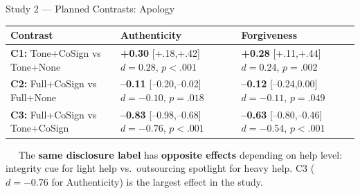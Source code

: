 \documentclass[10pt,aspectratio=169]{beamer}
\newcommand{\emphmark}[1]{\textcolor{chiAccent}{\textbf{#1}}}
\begin{document}
\begin{frame}{Study 2 --- Planned Contrasts: Apology}
\vspace{4pt}
\small
\renewcommand{\arraystretch}{1.3}
\begin{center}
\begin{tabular}{@{}p{4.4cm} p{4.6cm} p{4.2cm}@{}}
  \toprule
  \textbf{Contrast} & \textbf{Authenticity} & \textbf{Forgiveness}\\
  \midrule
  \textbf{C1:} Tone+CoSign \newline vs Tone+None
    & \textcolor{chiGreen}{\textbf{+0.30}} {\scriptsize[+.18,+.42]} \newline $d{=}0.28$, $p{<}.001$
    & \textcolor{chiGreen}{\textbf{+0.28}} {\scriptsize[+.11,+.44]} \newline $d{=}0.24$, $p{=}.002$\\[4pt]
  \textbf{C2:} Full+CoSign \newline vs Full+None
    & \textcolor{chiRed}{\textbf{--0.11}} {\scriptsize[--0.20,--0.02]} \newline $d{=}{-}0.10$, $p{=}.018$
    & \textcolor{chiRed}{\textbf{--0.12}} {\scriptsize[--0.24,0.00]} \newline $d{=}{-}0.11$, $p{=}.049$\\[4pt]
  \textbf{C3:} Full+CoSign \newline vs Tone+CoSign
    & \textcolor{chiRed}{\textbf{--0.83}} {\scriptsize[--0.98,--0.68]} \newline $d{=}{-}0.76$, $p{<}.001$
    & \textcolor{chiRed}{\textbf{--0.63}} {\scriptsize[--0.80,--0.46]} \newline $d{=}{-}0.54$, $p{<}.001$\\
  \bottomrule
\end{tabular}
\end{center}

\vspace{3pt}
\begin{findingbox}
\small
\faLightbulb~~ The \emphmark{same disclosure label} has \textbf{opposite effects} depending on help level:
integrity cue for light help vs.\ outsourcing spotlight for heavy help. C3 ($d{=}{-}0.76$ for Authenticity) is the largest effect in the study.
\end{findingbox}
\end{frame}

\end{document}
